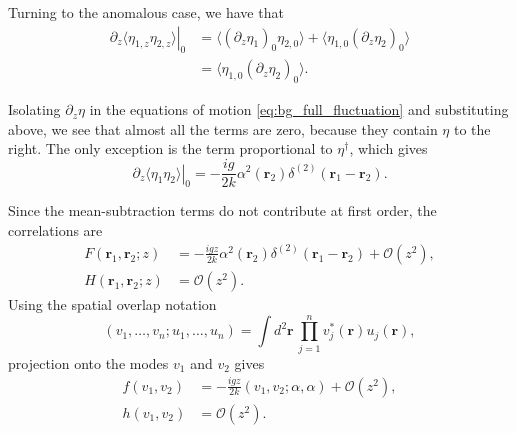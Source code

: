 \documentclass[%
 reprint,
 amsmath,amssymb,
 aps,
pra,
twocolumn,
]{revtex4-2}
\begin{document}
Turning to the anomalous case, we have that
\begin{equation}
\begin{aligned}
        \left.\partial_z\langle\eta_{1,z}\eta_{2,z}\rangle\right|_0
       &= \langle(\partial_z\eta_1)_0\eta_{2,0}\rangle
          +\langle\eta_{1, 0}(\partial_z\eta_2)_0\rangle \\&= \langle\eta_{1, 0}(\partial_z\eta_2)_0\rangle.
\end{aligned}
\end{equation}

Isolating $\partial_z \eta$ in the equations of motion \eqref{eq:bg_full_fluctuation} and substituting above, we see that almost all the terms are zero, because they contain $\eta$ to the right. The only exception is the term proportional to $\eta^\dagger$, which gives
\begin{equation}
    \left.\partial_z\langle\eta_1\eta_2\rangle\right|_0
       =-\frac{ig}{2k}\alpha^2(\mathbf r_2)
                     \delta^{(2)}(\mathbf r_1-\mathbf r_2).
\end{equation}



Since the mean-subtraction terms do not contribute at first order, the correlations are
\begin{equation}
\begin{aligned}
    F(\mathbf r_1,\mathbf r_2;z)
      &=-\frac{igz}{2k}\alpha^2(\mathbf r_2)
             \delta^{(2)}(\mathbf r_1-\mathbf r_2)+\mathcal{O}(z^2),\\
    H(\mathbf r_1,\mathbf r_2;z)&=\mathcal{O}(z^2).
\end{aligned}
    \label{eq:bg_first_correlations}
\end{equation}
Using the spatial overlap notation
\begin{equation}
    (v_1,\ldots,v_n;u_1,\ldots,u_n)
       =\int d^2\mathbf r\,\prod_{j=1}^n v_j^*(\mathbf r)u_j(\mathbf r),
\end{equation}
projection onto the modes $v_1$ and $v_2$ gives
\begin{equation}
\begin{aligned}
    f(v_1,v_2)&=-\frac{igz}{2k}(v_1,v_2;\alpha,\alpha)+\mathcal{O}(z^2),\\
    h(v_1,v_2)&=\mathcal{O}(z^2).
\end{aligned}
\end{equation}
\end{document}
